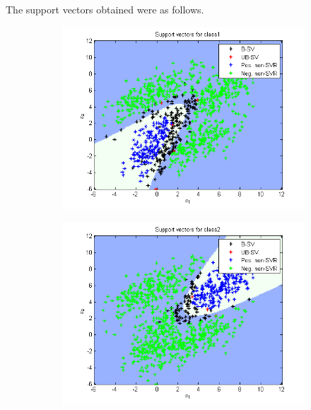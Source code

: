 \documentclass{article}
\begin{document}
\newpage
The support vectors obtained were as follows.
\begin{figure}
\begin{subfigure}{.5\textwidth}
  \centering
  \includegraphics[width=.8\linewidth]{Classification/1c/c_poly/sv1}
 
\end{subfigure}%
\begin{subfigure}{.5\textwidth}
  \centering
  \includegraphics[width=.8\linewidth]{Classification/1c/c_poly/sv2}
  
\end{subfigure}
\end{figure}
\end{document}

